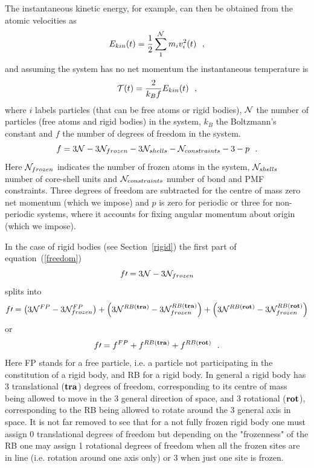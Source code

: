 The instantaneous kinetic energy, for example, can then be
obtained from the atomic velocities as
\begin{equation}
E_{kin}(t) = {1 \over 2} \sum_{1}^{\cal N} m_{i} v_{i}^{2}(t)~~, \label{ekin}
\end{equation}
and assuming the system has no net momentum the instantaneous
temperature is
\begin{equation}
{\cal T}(t) = \frac{2}{k_{B} f} E_{kin}(t)~~, \label{tinst}
\end{equation}
where $i$ labels particles (that can be free atoms or
rigid bodies), ${\cal N}$ the number of particles
(free atoms and rigid bodies) in
the system, $k_{B}$ the Boltzmann's constant and $f$ the number of
degrees of freedom in the system.
\begin{equation}
f = 3{\cal N} - 3{\cal N}_{frozen} - 3{\cal N}_{shells} -
{\cal N}_{constraints} - 3 - p~~. \label{freedom}
\end{equation}
Here ${\cal N}_{frozen}$ indicates the number of frozen atoms in
the system, ${\cal N}_{shells}$ number of core-shell units and
${\cal N}_{constraints}$ number of bond and PMF constraints.
Three degrees of freedom are subtracted for the centre of mass
zero net momentum (which we impose) and $p$ is zero for periodic
or three for non-periodic systems, where it accounts for fixing
angular momentum about origin (which we impose).

In the case of rigid bodies (see Section~\ref{rigid})
the first part of equation~(\ref{freedom})
\begin{equation}
f\prime = 3{\cal N} - 3{\cal N}_{frozen}
\end{equation}
splits into
\begin{equation}
f\prime = \left( 3{\cal N}^{FP} - 3{\cal N}^{FP}_{frozen} \right) +
          \left( 3{\cal N}^{RB {\bf (tra)}} - 3{\cal N}^{RB {\bf (tra)}}_{frozen} \right) +
          \left( 3{\cal N}^{RB {\bf (rot)}} - 3{\cal N}^{RB {\bf (rot)}}_{frozen} \right)
\end{equation}
or
\begin{equation}
f\prime = f^{FP} + f^{RB {\bf (tra)}} + f^{RB {\bf (rot)}}~~.
\end{equation}
Here FP stands for a free particle, i.e. a particle not
participating in the constitution of a rigid body, and RB for a
rigid body.  In general a rigid body has 3 translational (${\bf tra}$)
degrees of freedom, corresponding to its centre of mass being allowed
to move in the 3 general direction of space, and 3 rotational
(${\bf rot}$), corresponding to the RB being allowed to rotate around
the 3 general axis in space.  It is not far removed to see that for
a not fully frozen rigid body one must assign 0 translational degrees
of freedom but depending on the "frozenness" of the RB one may assign
1 rotational degrees of freedom when all the frozen sites are in line
(i.e. rotation around one axis only) or 3 when just one site is frozen.

